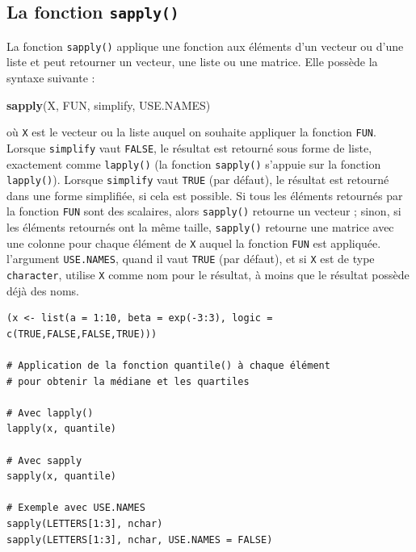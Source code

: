 \documentclass[
  11pt,
]{book}
\newenvironment{Shaded}{\begin{snugshade}}{\end{snugshade}}
\newcommand{\KeywordTok}[1]{\textcolor[rgb]{0.13,0.29,0.53}{\textbf{#1}}}
\newcommand{\NormalTok}[1]{#1}
\numberwithin{equation}{section}
\numberwithin{countremarque}{section}
\begin{document}
\hypertarget{boucles_vectorisation_apply_sapply}{%
\subsection{\texorpdfstring{La fonction \texttt{sapply()}}{La fonction sapply()}}\label{boucles_vectorisation_apply_sapply}}

La fonction \texttt{sapply()} applique une fonction aux éléments d'un vecteur ou d'une liste et peut retourner un vecteur, une liste ou une matrice. Elle possède la syntaxe suivante :

\begin{Shaded}
\begin{Highlighting}[]
\KeywordTok{sapply}\NormalTok{(X, FUN, simplify, USE.NAMES)}
\end{Highlighting}
\end{Shaded}

où \texttt{X} est le vecteur ou la liste auquel on souhaite appliquer la fonction \texttt{FUN}. Lorsque \texttt{simplify} vaut \texttt{FALSE}, le résultat est retourné sous forme de liste, exactement comme \texttt{lapply()} (la fonction \texttt{sapply()} s'appuie sur la fonction \texttt{lapply()}). Lorsque \texttt{simplify} vaut \texttt{TRUE} (par défaut), le résultat est retourné dans une forme simplifiée, si cela est possible. Si tous les éléments retournés par la fonction \texttt{FUN} sont des scalaires, alors \texttt{sapply()} retourne un vecteur ; sinon, si les éléments retournés ont la même taille, \texttt{sapply()} retourne une matrice avec une colonne pour chaque élément de \texttt{X} auquel la fonction \texttt{FUN} est appliquée. l'argument \texttt{USE.NAMES}, quand il vaut \texttt{TRUE} (par défaut), et si \texttt{X} est de type \texttt{character}, utilise \texttt{X} comme nom pour le résultat, à moins que le résultat possède déjà des noms.

\begin{lstlisting}
(x <- list(a = 1:10, beta = exp(-3:3), logic = c(TRUE,FALSE,FALSE,TRUE)))

# Application de la fonction quantile() à chaque élément
# pour obtenir la médiane et les quartiles

# Avec lapply()
lapply(x, quantile)

# Avec sapply
sapply(x, quantile)

# Exemple avec USE.NAMES
sapply(LETTERS[1:3], nchar)
sapply(LETTERS[1:3], nchar, USE.NAMES = FALSE)
\end{lstlisting}
\end{document}
